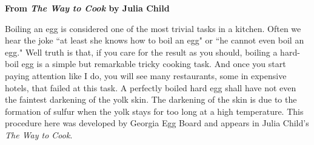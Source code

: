 \documentclass[11pt,letterpaper]{article}
\begin{document}


\begin{flushright}
{\bf From {\it The Way to Cook } by Julia Child }
\end{flushright}
 
 Boiling an egg is considered one of the most trivial tasks in a kitchen. Often we hear the joke ``at least she knows how to boil an egg" or ``he cannot even boil an egg." Well truth is that, if you care for the result as you should, boiling a hard-boil egg is a simple but remarkable tricky cooking task. And once you start paying attention like I do, you will see many restaurants, some in expensive hotels, that failed at this task. A perfectly boiled hard egg shall have not even the faintest darkening of the yolk skin. The darkening of the skin is due to the formation of sulfur when the yolk stays for too long at a high temperature. This procedure here was developed by Georgia Egg Board and appears in Julia Child's {\it The Way to Cook}.  
 
\end{document}
